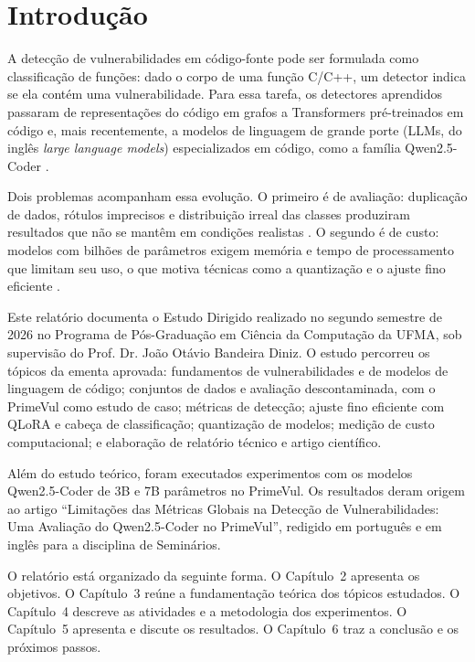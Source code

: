 \chapter{Introdução}

A detecção de vulnerabilidades em código-fonte pode ser formulada como classificação de funções: dado o corpo de uma função C/C++, um detector indica se ela contém uma vulnerabilidade. Para essa tarefa, os detectores aprendidos passaram de representações do código em grafos \cite{zhou2019devign} a Transformers pré-treinados em código \cite{fu2022linevul} e, mais recentemente, a modelos de linguagem de grande porte (LLMs, do inglês \textit{large language models}) especializados em código, como a família Qwen2.5-Coder \cite{hui2024qwen}.

Dois problemas acompanham essa evolução. O primeiro é de avaliação: duplicação de dados, rótulos imprecisos e distribuição irreal das classes produziram resultados que não se mantêm em condições realistas \cite{chakraborty2020reveal,ding2024primevul}. O segundo é de custo: modelos com bilhões de parâmetros exigem memória e tempo de processamento que limitam seu uso, o que motiva técnicas como a quantização e o ajuste fino eficiente \cite{hu2021lora,dettmers2023qlora}.

Este relatório documenta o Estudo Dirigido realizado no segundo semestre de 2026 no Programa de Pós-Graduação em Ciência da Computação da UFMA, sob supervisão do Prof. Dr. João Otávio Bandeira Diniz. O estudo percorreu os tópicos da ementa aprovada: fundamentos de vulnerabilidades e de modelos de linguagem de código; conjuntos de dados e avaliação descontaminada, com o PrimeVul como estudo de caso; métricas de detecção; ajuste fino eficiente com QLoRA e cabeça de classificação; quantização de modelos; medição de custo computacional; e elaboração de relatório técnico e artigo científico.

Além do estudo teórico, foram executados experimentos com os modelos Qwen2.5-Coder de 3B e 7B parâmetros no PrimeVul. Os resultados deram origem ao artigo ``Limitações das Métricas Globais na Detecção de Vulnerabilidades: Uma Avaliação do Qwen2.5-Coder no PrimeVul'', redigido em português e em inglês para a disciplina de Seminários.

O relatório está organizado da seguinte forma. O Capítulo~2 apresenta os objetivos. O Capítulo~3 reúne a fundamentação teórica dos tópicos estudados. O Capítulo~4 descreve as atividades e a metodologia dos experimentos. O Capítulo~5 apresenta e discute os resultados. O Capítulo~6 traz a conclusão e os próximos passos.
